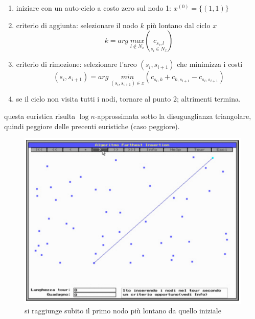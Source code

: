 \documentclass{article}
\begin{document}
\begin{enumerate}
    \item iniziare con un auto-ciclo a costo zero sul nodo 1: $x^{(0)}=\{(1,1)\}$
    \item criterio di aggiunta: selezionare il nodo $k$ più lontano dal ciclo $x$
          $$k=arg\;\underset{l\notin N_x}{max}\left(\underset{s_i\in N_x}{c_{s_i, l}}\right)$$
    \item criterio di rimozione: selezionare l'arco $(s_i,s_{i+1})$ che minimizza i costi
          $$(s_i,s_{i+1})=arg\;\underset{(s_i,s_{i+1})\in x}{min}(c_{s_i,k}+c_{k,s_{i+1}}-c_{s_i,s_{i+1}})$$
    \item se il ciclo non visita tutti i nodi, tornare al punto 2; altrimenti termina.
\end{enumerate}
questa euristica risulta $\log n$-approssimata sotto la disuguaglianza triangolare, quindi peggiore delle precenti
euristiche (caso peggiore).
\begin{figure}[H]
    \centering
    \includegraphics[scale=0.5]{images/farthest0.png}
    \caption{si raggiunge subito il primo nodo più lontano da quello iniziale}
\end{figure}
\end{document}
